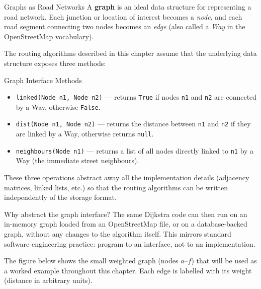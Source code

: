 \documentclass[aspectratio=169,10pt]{beamer}
\begin{document}
\begin{frame}[allowframebreaks]{Graphs as Road Networks}
  A \textbf{graph} is an ideal data structure for representing a road
  network.  Each junction or location of interest becomes a \emph{node},
  and each road segment connecting two nodes becomes an \emph{edge}
  (also called a \emph{Way} in the OpenStreetMap vocabulary).

  \medskip
  The routing algorithms described in this chapter assume that the
  underlying data structure exposes three methods:

  \begin{block}{Graph Interface Methods}
    \begin{itemize}
      \item \texttt{linked(Node n1, Node n2)} --- returns \texttt{True}
        if nodes \texttt{n1} and \texttt{n2} are connected by a Way,
        otherwise \texttt{False}.
      \item \texttt{dist(Node n1, Node n2)} --- returns the distance
        between \texttt{n1} and \texttt{n2} if they are linked by a Way,
        otherwise returns \texttt{null}.
      \item \texttt{neighbours(Node n1)} --- returns a list of all nodes
        directly linked to \texttt{n1} by a Way (the immediate street
        neighbours).
    \end{itemize}
  \end{block}

  \medskip
  These three operations abstract away all the implementation details
  (adjacency matrices, linked lists, etc.) so that the routing algorithms
  can be written independently of the storage format.

  \begin{exampleblock}{Why abstract the graph interface?}
    The same Dijkstra code can then run on an in-memory graph loaded from an
    OpenStreetMap file, or on a database-backed graph, without any changes
    to the algorithm itself.  This mirrors standard software-engineering
    practice: program to an interface, not to an implementation.
  \end{exampleblock}

  \framebreak

  The figure below shows the small weighted graph (nodes $a$--$f$) that will
  be used as a worked example throughout this chapter.  Each edge is labelled
  with its weight (distance in arbitrary units).


\end{frame}
\end{document}
